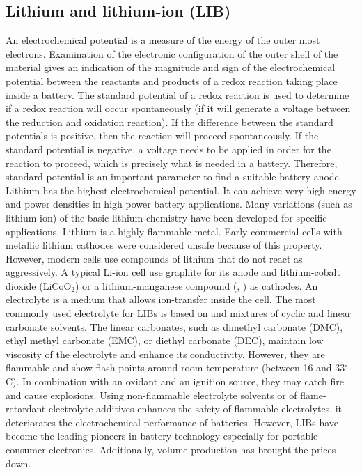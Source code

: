 \subsection{Lithium and lithium-ion (LIB)}
An electrochemical potential is a measure of the energy of the outer most electrons. Examination of the electronic configuration of the outer shell of the material gives an indication of the magnitude and sign of the electrochemical potential between the reactants and products of a redox reaction taking place inside a battery. The standard potential of a redox reaction is used to determine if a redox reaction will occur spontaneously (if it will generate a voltage between the reduction and oxidation reaction). If the difference between the standard potentials is positive, then the reaction will proceed spontaneously. If the standard potential is negative, a voltage needs to be applied in order for the reaction to proceed, which is precisely what is needed in a battery. Therefore, standard potential is an important parameter to find a suitable battery anode. Lithium has the highest electrochemical potential. It can achieve very high energy and power densities in high power battery applications. Many variations (such as lithium-ion) of the basic lithium chemistry have been developed for specific applications. Lithium is a highly flammable metal. Early commercial cells with metallic lithium cathodes were considered unsafe because of this property. However, modern cells use compounds of lithium that do not react as aggressively. A typical Li-ion cell use graphite for its anode and lithium-cobalt dioxide (LiCoO$_2$) or a lithium-manganese compound (, ) as cathodes. An electrolyte is a medium that allows ion-transfer inside the cell. The most commonly used electrolyte for LIBs is based on  and mixtures of cyclic and linear carbonate solvents. The linear carbonates, such as dimethyl carbonate (DMC), ethyl methyl carbonate (EMC), or diethyl carbonate (DEC), maintain low viscosity of the electrolyte and enhance its conductivity. However, they are flammable and show flash points around room temperature (between 16 and 33$^{\circ}$C). In combination with an oxidant and an ignition source, they may catch fire and cause explosions. Using non-flammable electrolyte solvents or of flame-retardant electrolyte additives enhances the safety of flammable electrolytes, it deteriorates the electrochemical performance of batteries. 
However, LIBs have become the leading pioneers in battery technology especially for portable consumer electronics. Additionally, volume production has brought the prices down.
